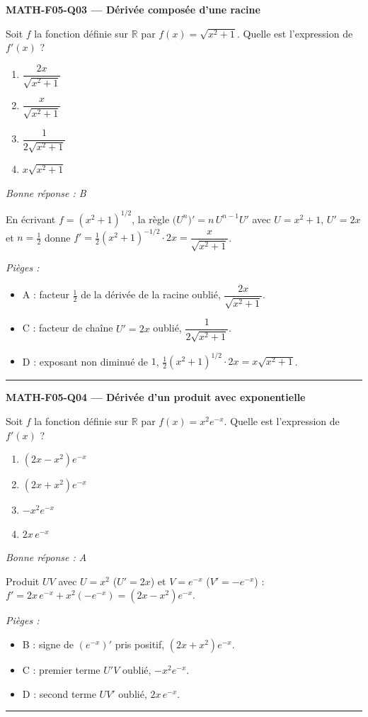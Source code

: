 \documentclass[11pt,a4paper]{article}
\newcommand{\R}{\mathbb{R}}\newcommand{\N}{\mathbb{N}}\newcommand{\Z}{\mathbb{Z}}
\begin{document}
\noindent\textbf{MATH-F05-Q03 --- Dérivée composée d'une racine}\par
Soit $f$ la fonction définie sur $\R$ par $f(x)=\sqrt{x^2+1}$. Quelle est l'expression de $f'(x)$ ?
\begin{enumerate}[label=\Alph*)]
\item $\dfrac{2x}{\sqrt{x^2+1}}$
\item $\dfrac{x}{\sqrt{x^2+1}}$
\item $\dfrac{1}{2\sqrt{x^2+1}}$
\item $x\sqrt{x^2+1}$
\end{enumerate}
\textit{Bonne réponse : B}\par
En écrivant $f=(x^2+1)^{1/2}$, la règle $\big(U^n\big)'=n\,U^{n-1}U'$ avec $U=x^2+1$, $U'=2x$ et $n=\tfrac12$ donne $f'=\tfrac12(x^2+1)^{-1/2}\cdot 2x=\dfrac{x}{\sqrt{x^2+1}}$.\par
\textit{Pièges :}
\begin{itemize}
\item A : facteur $\tfrac12$ de la dérivée de la racine oublié, $\dfrac{2x}{\sqrt{x^2+1}}$.
\item C : facteur de chaîne $U'=2x$ oublié, $\dfrac{1}{2\sqrt{x^2+1}}$.
\item D : exposant non diminué de $1$, $\tfrac12(x^2+1)^{1/2}\cdot 2x=x\sqrt{x^2+1}$.
\end{itemize}
\vspace{8pt}\hrule\vspace{8pt}

\noindent\textbf{MATH-F05-Q04 --- Dérivée d'un produit avec exponentielle}\par
Soit $f$ la fonction définie sur $\R$ par $f(x)=x^2e^{-x}$. Quelle est l'expression de $f'(x)$ ?
\begin{enumerate}[label=\Alph*)]
\item $(2x-x^2)e^{-x}$
\item $(2x+x^2)e^{-x}$
\item $-x^2e^{-x}$
\item $2x\,e^{-x}$
\end{enumerate}
\textit{Bonne réponse : A}\par
Produit $UV$ avec $U=x^2$ ($U'=2x$) et $V=e^{-x}$ ($V'=-e^{-x}$) : $f'=2x\,e^{-x}+x^2(-e^{-x})=(2x-x^2)e^{-x}$.\par
\textit{Pièges :}
\begin{itemize}
\item B : signe de $(e^{-x})'$ pris positif, $(2x+x^2)e^{-x}$.
\item C : premier terme $U'V$ oublié, $-x^2e^{-x}$.
\item D : second terme $UV'$ oublié, $2x\,e^{-x}$.
\end{itemize}
\vspace{8pt}\hrule\vspace{8pt}
\end{document}

